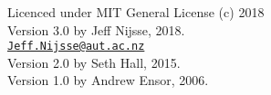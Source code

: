 \documentclass[a4paper,oneside]{book}
\begin{document}
 Licenced under MIT General License (c) 2018 \\     
 
 Version 3.0 by Jeff Nijsse, 2018.\\
\href{mailto:Jeff.Nijsse@aut.ac.nz}{\texttt{Jeff.Nijsse@aut.ac.nz}}\\
 Version 2.0 by Seth Hall, 2015.\\
 Version 1.0 by Andrew Ensor, 2006.
 
 
    \tableofcontents

  \mainmatter
%    
%    
%    
%    
%    
	

  \appendix
\end{document}
